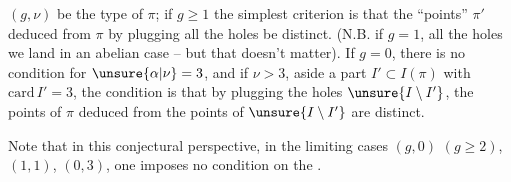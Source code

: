  $(g,\nu)$ be the type of $\pi$;  if $g\geq1$ the simplest criterion is that the ``\inserted{$\Gamma^{\natural}$-}points''  $\pi'$ deduced from $\pi$ by plugging all the holes be distinct.  (N.B. if $g=1$,    all the holes we land in an abelian case -- but that doesn't matter). If $g=0$,  there is no condition for $\unsure{\alpha|\nu}=3$, and if $\nu>3$,  aside a  part $I'\subset I(\pi)$ with $\mathrm{card}\,I'=3$, the condition is that by plugging the holes  $\unsure{I\setminus I'}$, the \inserted{$\Gamma^{\natural}$-}points of $\pi$ deduced from the points of $\unsure{I\setminus I'}$ are distinct.

Note that in this conjectural perspective, in the limiting cases $(g,0)$ $(g\geq2)$, $(1,1)$, $(0,3)$, one imposes no condition  on the .

